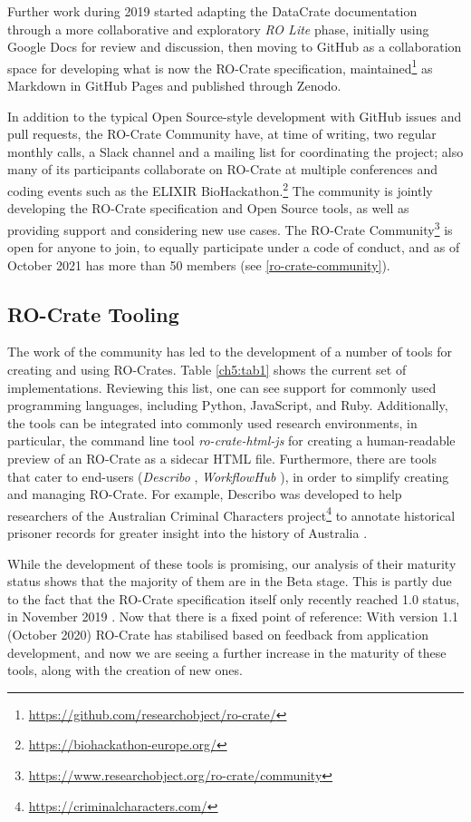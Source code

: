 Further work during 2019 started adapting the DataCrate documentation
through a more collaborative and exploratory \emph{RO Lite} phase,
initially using Google Docs for review and discussion, then moving to
GitHub as a collaboration space for developing what is now the RO-Crate
specification, maintained\footnote{\url{https://github.com/researchobject/ro-crate/}} as
Markdown in GitHub Pages
and published through Zenodo.

In addition to the typical Open Source-style development with GitHub
issues and pull requests, the RO-Crate Community have, at time of
writing, two regular monthly calls, a Slack channel and a mailing list
for coordinating the project; also many of its participants collaborate
on RO-Crate at multiple conferences and coding events such as the
ELIXIR BioHackathon.\footnote{\url{https://biohackathon-europe.org/}} The community
is jointly developing the RO-Crate specification and Open Source tools,
as well as providing support and considering new use cases. The
RO-Crate Community\footnote{\url{https://www.researchobject.org/ro-crate/community}}
is open for anyone to join, to equally participate under a code of
conduct, and as of October 2021 has more than 50 members (see \vref{ro-crate-community}).

\subsection{RO-Crate Tooling}\label{ch5:tooling}

The work of the community has led to the development of a number of
tools for creating and using RO-Crates. Table \vref{ch5:tab1} shows the current set
of implementations. Reviewing this list, one can see support for
commonly used programming languages, including Python, JavaScript, and
Ruby. Additionally, the tools can be integrated into commonly used
research environments, in particular, the command line tool
\textit{ro-crate-html-js} \cite{ch5-95} for creating a human-readable
preview of an RO-Crate as a sidecar HTML file. Furthermore, there are
tools that cater to end-users (\textit{Describo} \cite{ch5-78}, \textit{WorkflowHub}
\cite{ch5-124}), in order to simplify creating and managing
RO-Crate. For example, Describo was developed to help researchers of
the Australian Criminal Characters
project\footnote{\url{https://criminalcharacters.com/}} to annotate historical prisoner
records for greater insight into the history of Australia
\cite{ch5-97}.

While the development of these tools is promising, our analysis of their
maturity status shows that the majority of them are in the Beta stage.
This is partly due to the fact that the RO-Crate specification itself
only recently reached 1.0 status, in November 2019
\cite{ch5-105}. Now that there
is a fixed point of reference: With version 1.1 (October 2020)
\cite{ch5-107} RO-Crate has
stabilised based on feedback from application development, and now we
are seeing a further increase in the maturity of these tools, along with
the creation of new ones.

